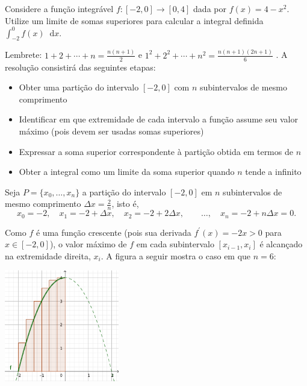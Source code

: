 \documentclass[12pt,a4paper]{article}
\newcommand*\diff{\mathop{}\!\mathrm{d}}
\begin{document}
\begin{ExerciseList}


\Exercise[title={2,0}]
Considere a função integrável $f:[-2, 0] \to [0,4]$ dada por $f(x)=4-x^2$. Utilize um limite de somas superiores para calcular a integral definida $\int_{-2}^0 f(x) \diff{x}$.

Lembrete:
\(
  1 + 2 + \cdots + n = \frac{n(n+1)}{2}
\)
e
\(
  1^2 + 2^2 + \cdots + n^2 = \frac{n(n+1)(2n+1)}{6}
\)
.
\Answer A resolução consistirá das seguintes etapas:
\begin{itemize}
  \item Obter uma partição do intervalo $[-2, 0]$ com $n$ subintervalos de mesmo comprimento
  \item Identificar em que extremidade de cada intervalo a função assume seu valor máximo (pois devem ser usadas somas superiores)
  \item Expressar a soma superior correspondente à partição obtida em termos de $n$
  \item Obter a integral como um limite da soma superior quando $n$ tende a infinito
\end{itemize}

Seja $P = \{ x_0, \ldots, x_n \}$ a partição do intervalo $[-2, 0]$ em $n$ subintervalos de mesmo comprimento $\Delta x = \frac{2}{n}$, isto é,
\[
  x_0 = -2,\quad
  x_1 = -2 + \Delta x,\quad
  x_2 = -2 + 2\Delta x,\quad
  \quad\ldots,\quad
  x_n = -2 + n\Delta x = 0.
\]

Como $f$ é uma função crescente (pois sua derivada $f^\prime(x) = -2x > 0$ para $x \in [-2, 0]$), o valor máximo de $f$ em cada subintervalo $[x_{i-1}, x_i]$ é alcançado na extremidade direita, $x_i$. A figura a seguir mostra o caso em que $n = 6$:

\begin{center}
\includegraphics[width=5.0cm]{img/prova-1-nex-soma-superior.pdf}
\end{center}


\end{ExerciseList}
\end{document}
